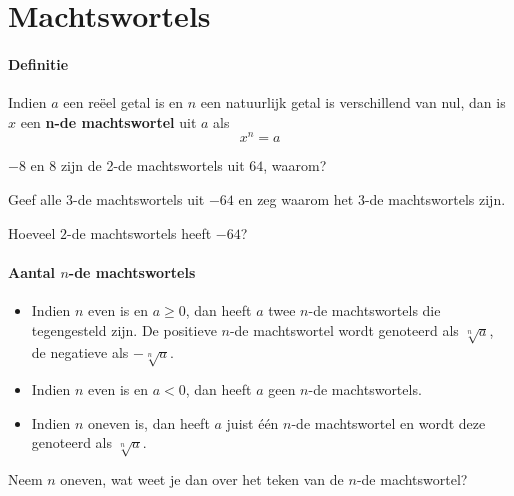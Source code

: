 \documentclass[12pt,twoside]{article}
\begin{document}
\pagebreak
\section{Machtswortels}

\paragraph*{Definitie}
\begin{mdframed}
Indien $a$ een reëel getal is en $n$ een natuurlijk getal is verschillend van nul, dan is $x$ een {\bf n-de machtswortel} uit $a$ als
$$x^n=a$$
\end{mdframed}

\begin{oefening}
$-8$ en $8$ zijn de 2-de machtswortels uit $64$, waarom?
\end{oefening}

\begin{oefening}
Geef alle $3$-de machtswortels uit $-64$ en zeg waarom het $3$-de machtswortels zijn.
\end{oefening}

\begin{oefening}
Hoeveel $2$-de machtswortels heeft $-64$?
\end{oefening}

\paragraph*{Aantal $n$-de machtswortels}
\begin{mdframed}
\begin{itemize}
  \item Indien $n$ even is en $a\geq 0$, dan heeft $a$ twee $n$-de machtswortels die tegengesteld zijn. De positieve $n$-de machtswortel wordt genoteerd als $\sqrt[n]{a}$, de negatieve als $-\sqrt[n]{a}$.
  \item Indien $n$ even is en $a < 0$, dan heeft $a$ geen $n$-de machtswortels.
  \item Indien $n$ oneven is, dan heeft $a$ juist één $n$-de machtswortel en wordt deze genoteerd als $\sqrt[n]{a}$.
\end{itemize}
\end{mdframed}

\begin{oefening}
Neem $n$ oneven, wat weet je dan over het teken van de $n$-de machtswortel?
\end{oefening}
\end{document}
